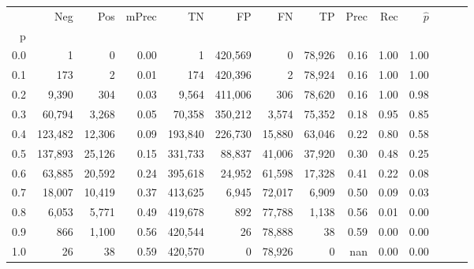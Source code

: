 \begin{tabular}{rrrrrrrrrrrrrr}
\toprule
{} &      Neg &     Pos & mPrec &       TN &       FP &      FN &      TP &  Prec &   Rec & $\hat{p}$ \\
p   &          &         &       &          &          &         &         &       &       &           \\
\midrule
0.0 &        1 &       0 &  0.00 &        1 &  420,569 &       0 &  78,926 &  0.16 &  1.00 &      1.00 \\
0.1 &      173 &       2 &  0.01 &      174 &  420,396 &       2 &  78,924 &  0.16 &  1.00 &      1.00 \\
0.2 &    9,390 &     304 &  0.03 &    9,564 &  411,006 &     306 &  78,620 &  0.16 &  1.00 &      0.98 \\
0.3 &   60,794 &   3,268 &  0.05 &   70,358 &  350,212 &   3,574 &  75,352 &  0.18 &  0.95 &      0.85 \\
0.4 &  123,482 &  12,306 &  0.09 &  193,840 &  226,730 &  15,880 &  63,046 &  0.22 &  0.80 &      0.58 \\
0.5 &  137,893 &  25,126 &  0.15 &  331,733 &   88,837 &  41,006 &  37,920 &  0.30 &  0.48 &      0.25 \\
0.6 &   63,885 &  20,592 &  0.24 &  395,618 &   24,952 &  61,598 &  17,328 &  0.41 &  0.22 &      0.08 \\
0.7 &   18,007 &  10,419 &  0.37 &  413,625 &    6,945 &  72,017 &   6,909 &  0.50 &  0.09 &      0.03 \\
0.8 &    6,053 &   5,771 &  0.49 &  419,678 &      892 &  77,788 &   1,138 &  0.56 &  0.01 &      0.00 \\
0.9 &      866 &   1,100 &  0.56 &  420,544 &       26 &  78,888 &      38 &  0.59 &  0.00 &      0.00 \\
1.0 &       26 &      38 &  0.59 &  420,570 &        0 &  78,926 &       0 &   nan &  0.00 &      0.00 \\
\bottomrule
\end{tabular}
